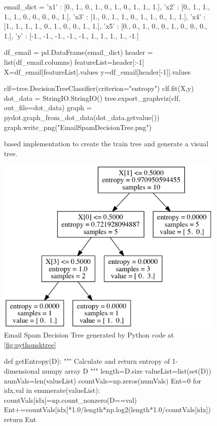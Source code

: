 \documentclass[a4paper, 11pt]{article}
\begin{document}
\begin{enumerate}[(a)]
\begin{figure}
\begin{python}[caption={SVM Primal Form},label={lst:pythonsktree}]
email_dict = {'x1' : [0., 1., 0., 1., 0., 1., 0., 1., 1., 1.],
     'x2' : [0., 1., 1., 1., 1., 0., 0., 0., 0., 1.],
     'x3' : [1., 0., 1., 1., 0., 1., 1., 0., 1., 1.],
     'x4' : [1., 1., 1., 1., 0., 1., 0., 0., 1., 1.],
     'x5' : [0., 0., 1., 0., 0., 1., 0., 0., 0., 1.],
     'y' : [-1., -1., -1., -1., -1., 1., 1., 1., 1., -1.]
     }

df_email = pd.DataFrame(email_dict)
header = list(df_email.columns)
featureList=header[:-1]
X=df_email[featureList].values
y=df_email[header[-1]].values

clf=tree.DecisionTreeClassifier(criterion="entropy")
clf.fit(X,y)
dot_data = StringIO.StringIO()
tree.export_graphviz(clf, out_file=dot_data)
graph = pydot.graph_from_dot_data(dot_data.getvalue())
graph.write_png("EmailSpamDecisionTree.png")
\end{python}
\caption[]{ based implementation to create the train tree and generate a visual tree.}
\label{fig:pythonsktree}
\end{figure}

\begin{figure}
\centering
\includegraphics[scale=0.70]{EmailSpamDecisionTree.png}
\caption[]{Email Spam Decision Tree generated by Python code at \autoref{fig:pythonsktree}}
\label{fig:emailtree}
\end{figure}

\begin{figure}
\begin{python}[caption={SVM Primal Form},label={lst:pythonsktree}]
def getEntropy(D):
    """
    Calculate and return entropy of 1-dimensional numpy array D 
    """
    length=D.size
    valueList=list(set(D))
    numVals=len(valueList)
    countVals=np.zeros(numVals)
    Ent=0
    for idx,val in enumerate(valueList):
        countVals[idx]=np.count_nonzero(D==val)
        Ent+=countVals[idx]*1.0/length*np.log2(length*1.0/countVals[idx])
    return Ent 


\end{python}
\end{figure}
\end{enumerate}
\end{document}
